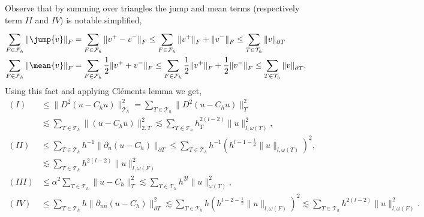 Observe that by summing over triangles the jump and mean terms (respectively term $II$ and
$IV$) is notable simplified, \[
    \begin{split}
\sum_{F \in \mathcal{F}_{h} }^{}  \| \jump{ v }   \|_{F  }^{  } & =\sum_{F \in \mathcal{F}_{h} }^{}  \|  v^{+} - v^{-}    \|_{F  }^{  } \le \sum_{F \in \mathcal{F}_{h} }^{} \| v^{+} \|_{  F}^{  }  + \| v^{-} \|_{F }^{  } \le \sum_{T \in
\mathcal{T}_{h} }^{} \| v \|_{ \partial T }^{  } \\
\sum_{F \in \mathcal{F}_{h} }^{}  \| \mean{ v }   \|_{F  }^{  } & =\sum_{F \in \mathcal{F}_{h} }^{} \frac{1}{2} \|  v^{+} + v^{-}    \|_{F  }^{  } \le \sum_{F \in \mathcal{F}_{h} }^{} \frac{1}{2} \| v^{+} \|_{  F}^{  }  +\frac{1}{2} \| v^{-} \|_{F }^{  } \le \sum_{T \in
\mathcal{T}_{h} }^{} \| v \|_{ \partial T }^{  }. \\
    \end{split}
\]
Using this fact and applying Cléments lemma we get,
\begin{equation*}
    \begin{split}
(I) & \le  \| D^2\left( u - C_{h}u \right)  \|_{ \mathcal{T} _{h} }^{ 2 } = \sum_{T \in \mathcal{T} _{h}}^{} \| D^2 \left( u - C_{h}u \right)  \|_{ T }^{ 2 } \\
 & \lesssim \sum_{T \in \mathcal{T} _{h}}^{}  \| \left( u - C_{h}u \right)  \|_{2,T  }^{  2} \lesssim  \sum_{T \in \mathcal{T} _{h}}^{}  h_{T}^{2\left( l-2 \right) } \| u \|_{l, \omega \left( T \right)   }^{2  }, \\
    (II) & \le  \sum_{T \in \mathcal{T} _{h}}^{}  h^{-1} \| \partial _{n} \left( u - C_{h} \right)  \|_{ \partial T  }^{  } \le  \sum_{T \in \mathcal{T} _{h}}^{}  h^{-1} \left( h^{l -1 -\frac{1}{2}} \| u \|_{ l, \omega \left( T \right)  }^{  }
    \right)^{2},  \\
    & \lesssim \sum_{T \in \mathcal{T} _{h}}^{}  h^{2(l-2)} \| u \|_{ l, \omega \left( F \right)  }^{ 2 } \\
 (III)  &\le   \alpha^2  \sum_{T \in \mathcal{T} _{h}}^{}  \| u - C_{h} \|_{ T }^{ 2 } \lesssim   \sum_{T \in \mathcal{T} _{h}}^{} h^{2l} \| u \|_{ \omega \left( T \right)  }^{ 2 }, \\
(IV) & \le \sum_{T \in \mathcal{T} _{h}}^{}  h \| \partial _{nn} \left( u - C_{h} \right)  \|_{\partial T  }^{2  } \lesssim  \sum_{T \in  \mathcal{T} _{h}}^{} h \left( h^{l -2 -\frac{1}{2}} \| u \|_{ l, \omega \left( F \right)  }^{  }  \right)^{2}
\lesssim
\sum_{T  \in  \mathcal{T} _{h}}^{} h^{2(l-2)}  \| u \|_{ l, \omega \left( F \right)  }^{ 2 }.
 \end{split}
\end{equation*}
